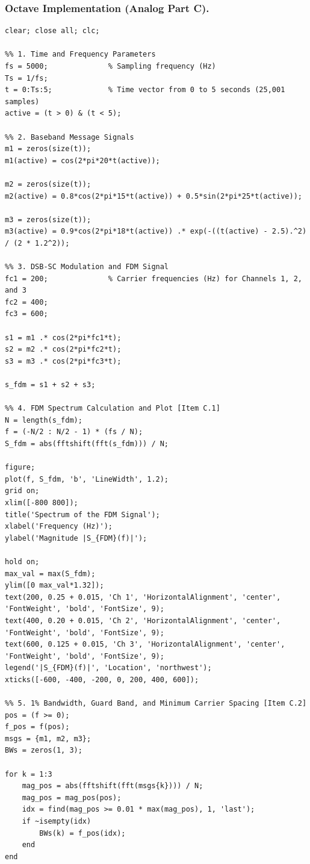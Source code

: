 \documentclass[a4paper]{article}
\begin{document}
\subsubsection*{Octave Implementation (Analog Part C).}
\begin{lstlisting}[frame=single, breaklines=true, basicstyle=\ttfamily\scriptsize]
clear; close all; clc;

%% 1. Time and Frequency Parameters
fs = 5000;              % Sampling frequency (Hz)
Ts = 1/fs;
t = 0:Ts:5;             % Time vector from 0 to 5 seconds (25,001 samples)
active = (t > 0) & (t < 5);

%% 2. Baseband Message Signals
m1 = zeros(size(t));
m1(active) = cos(2*pi*20*t(active));

m2 = zeros(size(t));
m2(active) = 0.8*cos(2*pi*15*t(active)) + 0.5*sin(2*pi*25*t(active));

m3 = zeros(size(t));
m3(active) = 0.9*cos(2*pi*18*t(active)) .* exp(-((t(active) - 2.5).^2) / (2 * 1.2^2));

%% 3. DSB-SC Modulation and FDM Signal
fc1 = 200;              % Carrier frequencies (Hz) for Channels 1, 2, and 3
fc2 = 400;
fc3 = 600;

s1 = m1 .* cos(2*pi*fc1*t);
s2 = m2 .* cos(2*pi*fc2*t);
s3 = m3 .* cos(2*pi*fc3*t);

s_fdm = s1 + s2 + s3;

%% 4. FDM Spectrum Calculation and Plot [Item C.1]
N = length(s_fdm);
f = (-N/2 : N/2 - 1) * (fs / N);
S_fdm = abs(fftshift(fft(s_fdm))) / N;

figure;
plot(f, S_fdm, 'b', 'LineWidth', 1.2);
grid on;
xlim([-800 800]);
title('Spectrum of the FDM Signal');
xlabel('Frequency (Hz)');
ylabel('Magnitude |S_{FDM}(f)|');

hold on;
max_val = max(S_fdm);
ylim([0 max_val*1.32]);
text(200, 0.25 + 0.015, 'Ch 1', 'HorizontalAlignment', 'center', 'FontWeight', 'bold', 'FontSize', 9);
text(400, 0.20 + 0.015, 'Ch 2', 'HorizontalAlignment', 'center', 'FontWeight', 'bold', 'FontSize', 9);
text(600, 0.125 + 0.015, 'Ch 3', 'HorizontalAlignment', 'center', 'FontWeight', 'bold', 'FontSize', 9);
legend('|S_{FDM}(f)|', 'Location', 'northwest');
xticks([-600, -400, -200, 0, 200, 400, 600]);

%% 5. 1% Bandwidth, Guard Band, and Minimum Carrier Spacing [Item C.2]
pos = (f >= 0);
f_pos = f(pos);
msgs = {m1, m2, m3};
BWs = zeros(1, 3);

for k = 1:3
    mag_pos = abs(fftshift(fft(msgs{k}))) / N;
    mag_pos = mag_pos(pos);
    idx = find(mag_pos >= 0.01 * max(mag_pos), 1, 'last');
    if ~isempty(idx)
        BWs(k) = f_pos(idx);
    end
end


\end{lstlisting}
\end{document}
